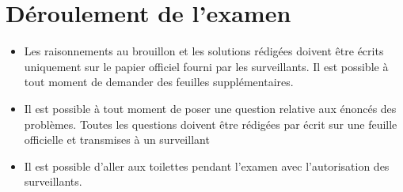 \documentclass[12pt,a4paper]{article}
\begin{document}
\section{Déroulement de l'examen}
\begin{itemize}

	
	\item Les raisonnements au brouillon et les solutions rédigées doivent être écrits uniquement sur le papier officiel fourni par les surveillants. Il est possible à tout moment de demander des feuilles supplémentaires.
	
	\item Il est possible à tout moment de poser une question relative aux énoncés des problèmes. Toutes les questions doivent être rédigées par écrit sur une feuille officielle et transmises à un surveillant
	
	
	
	
	
	
	\item Il est possible d'aller aux toilettes pendant l'examen avec l'autorisation des surveillants.
	
	
\end{itemize}
\end{document}
